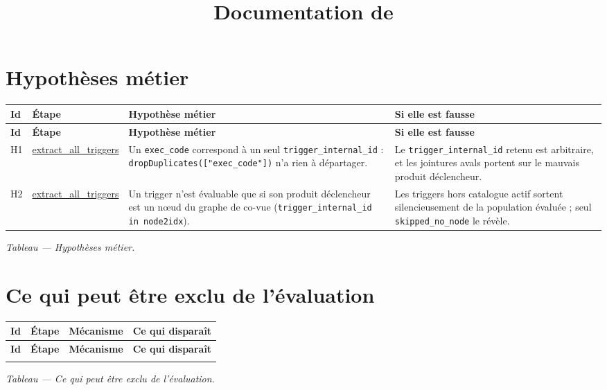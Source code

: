 \documentclass[11pt,a4paper]{article}
\title{Documentation de \code{model\_test\_prototype.ipynb}}
\author{}
\date{}
\newcommand{\code}[1]{\texttt{\small #1}}
\begin{document}
\maketitle

\section{Hypothèses métier}
\label{sec:hypotheses}

{\small
\begin{longtable}{@{}l p{2.45cm} p{5.9cm} p{4.5cm}@{}}
\toprule
\textbf{Id} & \textbf{Étape} & \textbf{Hypothèse métier} & \textbf{Si elle est fausse} \\
\midrule
\endfirsthead
\toprule
\textbf{Id} & \textbf{Étape} & \textbf{Hypothèse métier} & \textbf{Si elle est fausse} \\
\midrule
\endhead
\bottomrule
\endfoot

H1 & \url{extract_all_triggers} & Un \code{exec\_code} correspond à un seul
\code{trigger\_internal\_id} : \code{dropDuplicates(["exec\_code"])} n'a rien à départager. &
Le \code{trigger\_internal\_id} retenu est arbitraire, et les jointures avals portent sur le
mauvais produit déclencheur. \\
\addlinespace
H2 & \url{extract_all_triggers} & Un trigger n'est évaluable que si son produit déclencheur est un
nœud du graphe de co-vue (\code{trigger\_internal\_id in node2idx}). & Les triggers hors catalogue
actif sortent silencieusement de la population évaluée ; seul \code{skipped\_no\_node} le révèle. \\

\end{longtable}
}
\label{tab:hypotheses}
\begin{center}\footnotesize\itshape Tableau \thetable{} --- Hypothèses métier.\end{center}

\clearpage
\section{Ce qui peut être exclu de l'évaluation}
\label{sec:exclusions}

{\small
\begin{longtable}{@{}l p{3.2cm} p{4.4cm} p{5.2cm}@{}}
\toprule
\textbf{Id} & \textbf{Étape} & \textbf{Mécanisme} & \textbf{Ce qui disparaît} \\
\midrule
\endfirsthead
\toprule
\textbf{Id} & \textbf{Étape} & \textbf{Mécanisme} & \textbf{Ce qui disparaît} \\
\midrule
\endhead
\bottomrule
\endfoot

\end{longtable}
}
\label{tab:exclusions}
\begin{center}\footnotesize\itshape Tableau \thetable{} --- Ce qui peut être exclu de l'évaluation.\end{center}
\end{document}
